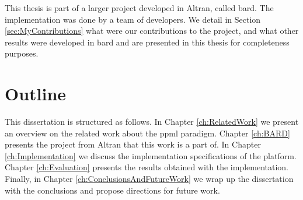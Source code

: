 This thesis is part of a larger project developed in Altran, called \ac{bard}. The implementation was done by a team of developers. We detail in Section \ref{sec:MyContributions} what were our contributions to the project, and what other results were developed in \ac{bard} and are presented in this thesis for completeness purposes.



\section{Outline}
\label{sec:Intro_StructureOfThisDocument}
This dissertation is structured as follows.
In Chapter \ref{ch:RelatedWork} we present an overview on the related work about the \ac{ppml} paradigm.
Chapter \ref{ch:BARD} presents the project from Altran that this work is a part of.
In Chapter \ref{ch:Implementation} we discuss the implementation specifications of the platform.
Chapter \ref{ch:Evaluation} presents the results obtained with the implementation.
Finally, in Chapter \ref{ch:ConclusionsAndFutureWork} we wrap up the dissertation with the conclusions and propose directions for future work.

